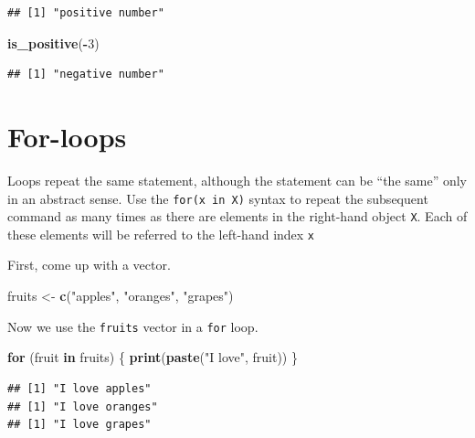 \documentclass[]{book}
\newenvironment{Shaded}{\begin{snugshade}}{\end{snugshade}}
\newcommand{\KeywordTok}[1]{\textcolor[rgb]{0.13,0.29,0.53}{\textbf{#1}}}
\newcommand{\DecValTok}[1]{\textcolor[rgb]{0.00,0.00,0.81}{#1}}
\newcommand{\StringTok}[1]{\textcolor[rgb]{0.31,0.60,0.02}{#1}}
\newcommand{\ControlFlowTok}[1]{\textcolor[rgb]{0.13,0.29,0.53}{\textbf{#1}}}
\newcommand{\OperatorTok}[1]{\textcolor[rgb]{0.81,0.36,0.00}{\textbf{#1}}}
\newcommand{\NormalTok}[1]{#1}
\theoremstyle{definition}
\theoremstyle{definition}
\theoremstyle{definition}
\theoremstyle{remark}
\begin{document}
\begin{verbatim}
## [1] "positive number"
\end{verbatim}

\begin{Shaded}
\begin{Highlighting}[]
\KeywordTok{is_positive}\NormalTok{(}\OperatorTok{-}\DecValTok{3}\NormalTok{)}
\end{Highlighting}
\end{Shaded}

\begin{verbatim}
## [1] "negative number"
\end{verbatim}

\section{For-loops}\label{for-loops}

Loops repeat the same statement, although the statement can be ``the
same'' only in an abstract sense. Use the \texttt{for(x\ in\ X)} syntax
to repeat the subsequent command as many times as there are elements in
the right-hand object \texttt{X}. Each of these elements will be
referred to the left-hand index \texttt{x}

First, come up with a vector.

\begin{Shaded}
\begin{Highlighting}[]
\NormalTok{fruits <-}\StringTok{ }\KeywordTok{c}\NormalTok{(}\StringTok{"apples"}\NormalTok{, }\StringTok{"oranges"}\NormalTok{, }\StringTok{"grapes"}\NormalTok{)}
\end{Highlighting}
\end{Shaded}

Now we use the \texttt{fruits} vector in a \texttt{for} loop.

\begin{Shaded}
\begin{Highlighting}[]
\ControlFlowTok{for}\NormalTok{ (fruit }\ControlFlowTok{in}\NormalTok{ fruits) \{}
  \KeywordTok{print}\NormalTok{(}\KeywordTok{paste}\NormalTok{(}\StringTok{"I love"}\NormalTok{, fruit))}
\NormalTok{\}}
\end{Highlighting}
\end{Shaded}

\begin{verbatim}
## [1] "I love apples"
## [1] "I love oranges"
## [1] "I love grapes"
\end{verbatim}
\end{document}
